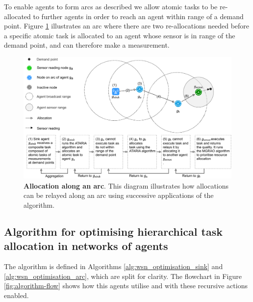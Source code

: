 To enable agents to form arcs as described we allow atomic tasks to be re-allocated to further agents in order to reach an agent within range of a demand point. Figure \ref{fig:arc-flow} illustrates an arc where there are two re-allocations needed before a specific atomic task is allocated to an agent whose sensor is in range of the demand point, and can therefore make a measurement.

\begin{figure}[ht]
	\centering
	\includegraphics[width=0.9\linewidth]{arc-flow}
	\caption{\textbf{Allocation along an arc}. This diagram illustrates how allocations can be relayed along an arc using successive applications of the \acronymATARIA{}{} algorithm.}
	\label{fig:arc-flow}
\end{figure}

\subsection{Algorithm for optimising hierarchical task allocation in networks of agents}
The \acronymWSNOptimisationExtended{}{} algorithm is defined in Algorithms \ref{alg:wsn_optimisation_sink}
and \ref{alg:wsn_optimisation_arc}, which are split for clarity. The flowchart in Figure \ref{fig:algorithm-flow} shows how this agents utilise \acronymATARIA{}{} and \acronymMGRAO{}{} with these recursive actions enabled. 

